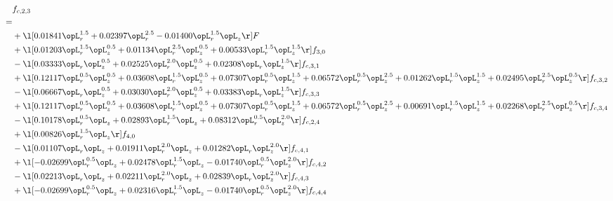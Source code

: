 \begin{alignat}{2} 
\label{eq:f_23_2} 
& f_{c,2,3} \nonumber \\ 
 = \\ 
& + \l[  0.01841 \opL_r^{1.5} +  0.02397 \opL_r^{2.5}   -0.01400 \opL_r^{1.5} \opL_z  \r] F \nonumber \\ 
& + \l[  0.01203 \opL_r^{1.5} \opL_z^{0.5} +  0.01134 \opL_r^{2.5} \opL_z^{0.5} +  0.00533 \opL_r^{1.5} \opL_z^{1.5}  \r] f_{3,0} \nonumber \\ 
& - \l[  0.03333 \opL_r \opL_z^{0.5} +  0.02525 \opL_r^{2.0} \opL_z^{0.5} +  0.02308 \opL_r \opL_z^{1.5}  \r] f_{c,3,1} \nonumber \\ 
& + \l[  0.12117 \opL_r^{0.5} \opL_z^{0.5} +  0.03608 \opL_r^{1.5} \opL_z^{0.5} +  0.07307 \opL_r^{0.5} \opL_z^{1.5} +  0.06572 \opL_r^{0.5} \opL_z^{2.5} +  0.01262 \opL_r^{1.5} \opL_z^{1.5} +  0.02495 \opL_r^{2.5} \opL_z^{0.5}  \r] f_{c,3,2} \nonumber \\ 
& - \l[  0.06667 \opL_r \opL_z^{0.5} +  0.03030 \opL_r^{2.0} \opL_z^{0.5} +  0.03383 \opL_r \opL_z^{1.5}  \r] f_{c,3,3} \nonumber \\ 
& + \l[  0.12117 \opL_r^{0.5} \opL_z^{0.5} +  0.03608 \opL_r^{1.5} \opL_z^{0.5} +  0.07307 \opL_r^{0.5} \opL_z^{1.5} +  0.06572 \opL_r^{0.5} \opL_z^{2.5} +  0.00691 \opL_r^{1.5} \opL_z^{1.5} +  0.02268 \opL_r^{2.5} \opL_z^{0.5}  \r] f_{c,3,4} \nonumber \\ 
& - \l[  0.10178 \opL_r^{0.5} \opL_z +  0.02893 \opL_r^{1.5} \opL_z +  0.08312 \opL_r^{0.5} \opL_z^{2.0}  \r] f_{c,2,4} \nonumber \\ 
& + \l[  0.00826 \opL_r^{1.5} \opL_z  \r] f_{4,0} \nonumber \\ 
& - \l[  0.01107 \opL_r \opL_z +  0.01911 \opL_r^{2.0} \opL_z +  0.01282 \opL_r \opL_z^{2.0}  \r] f_{c,4,1} \nonumber \\ 
& + \l[  -0.02699 \opL_r^{0.5} \opL_z +  0.02478 \opL_r^{1.5} \opL_z   -0.01740 \opL_r^{0.5} \opL_z^{2.0}  \r] f_{c,4,2} \nonumber \\ 
& - \l[  0.02213 \opL_r \opL_z +  0.02211 \opL_r^{2.0} \opL_z +  0.02839 \opL_r \opL_z^{2.0}  \r] f_{c,4,3} \nonumber \\ 
& + \l[  -0.02699 \opL_r^{0.5} \opL_z +  0.02316 \opL_r^{1.5} \opL_z   -0.01740 \opL_r^{0.5} \opL_z^{2.0}  \r] f_{c,4,4} \nonumber \\ 
\end{alignat} 


